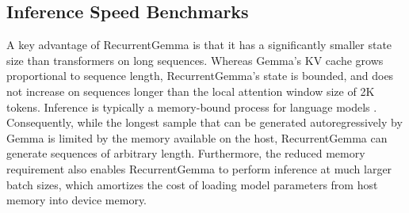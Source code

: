 \documentclass[9pt, a4paper, logo, twocolumn, copyright, nonumbering]{googledeepmind}
\begin{document}

\subsection{Inference Speed Benchmarks}

A key advantage of RecurrentGemma is that it has a significantly smaller state size than transformers on long sequences. Whereas Gemma's KV cache grows proportional to sequence length, RecurrentGemma's state is bounded, and does not increase on sequences longer than the local attention window size of 2K tokens. Inference is typically a memory-bound process for language models \citep{de2024griffin}. Consequently, while the longest sample that can be generated autoregressively by Gemma is limited by the memory available on the host, RecurrentGemma can generate sequences of arbitrary length. Furthermore, the reduced memory requirement also enables RecurrentGemma to perform inference at much larger batch sizes, which amortizes the cost of loading model parameters from host memory into device memory. 

\end{document}
